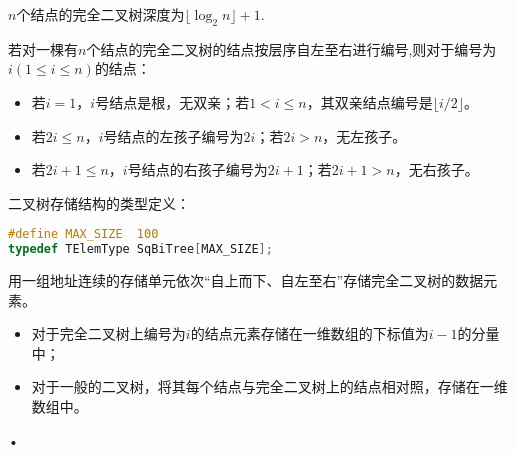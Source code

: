 \begin{frame}
\begin{xingzhi}
$n$个结点的完全二叉树深度为$\lfloor \log_2 n \rfloor+1$.
\end{xingzhi}

\end{frame}
%
%
\begin{frame}
\begin{xingzhi}[5]
若对一棵有$n$个结点的完全二叉树的结点按层序自左至右进行编号,则对于编号为$i(1\le i\le n)$的结点：
\begin{itemize}
\item 
若$i=1$，$i$号结点是根，无双亲；若$1<i\le n$，其双亲结点编号是$\lfloor i/2 \rfloor$。
\item 
若$2i\le n$，$i$号结点的左孩子编号为$2i$；若$2i>n$，无左孩子。
\item 
若$2i+1\le n$，$i$号结点的右孩子编号为$2i+1$；若$2i+1>n$，无右孩子。
\end{itemize}
\end{xingzhi}

\end{frame}
%
\begin{frame}[fragile]
二叉树存储结构的类型定义：
\begin{lstlisting}[language=C]
#define MAX_SIZE  100
typedef TElemType SqBiTree[MAX_SIZE];
\end{lstlisting}
 用一组地址连续的存储单元依次“自上而下、自左至右”存储完全二叉树的数据元素。
\begin{itemize}
\item 
对于完全二叉树上编号为$i$的结点元素存储在一维数组的下标值为$i-1$的分量中；
\item 
对于一般的二叉树，将其每个结点与完全二叉树上的结点相对照，存储在一维数组中。
\end{itemize}•
\end{frame}
%
